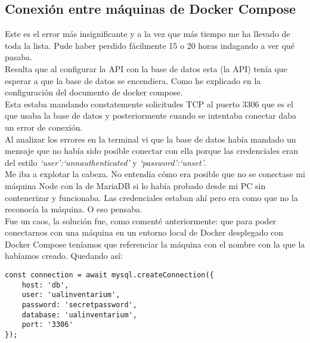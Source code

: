 \subsection{Conexión entre máquinas de Docker Compose}
Este es el error más insignificante y a la vez que más tiempo me ha llevado de toda la lista. Pude haber perdido fácilmente 15 o 20 horas indagando a ver qué pasaba.
\\Resulta que al configurar la API con la base de datos esta (la API) tenía que esperar a que la base de datos se encendiera. Como he explicado en la configuración del documento de docker compose.
\\Esta estaba mandando constatemente solicitudes TCP al puerto 3306 que es el que usaba la base de datos y posteriormente cuando se intentaba conectar daba un error de conexión.
\\Al analizar los errores en la terminal vi que la base de datos había mandado un mensaje que no había sido posible conectar con ella porque las credenciales eran del estilo \textit{`user':`unnauthenticated'} y \textit{`password':`unset'}.
\\Me iba a explotar la cabeza. No entendía cómo era posible que no se conectase mi máquina Node con la de MariaDB si lo había probado desde mi PC sin contenerizar y funcionaba. Las credenciales estaban ahí pero era como que no la reconocía la máquina. O eso pensaba.
\\Fue un caos, la solución fue, como comenté anteriormente: que para poder conectarnos con una máquina en un entorno local de Docker desplegado con Docker Compose teníamos que referenciar la máquina con el nombre con la que la habíamos creado. Quedando así:
\begin{verbatim}
const connection = await mysql.createConnection({
    host: 'db',
    user: 'ualinventarium',
    password: 'secretpassword',
    database: 'ualinventarium',
    port: '3306'
});
\end{verbatim}
